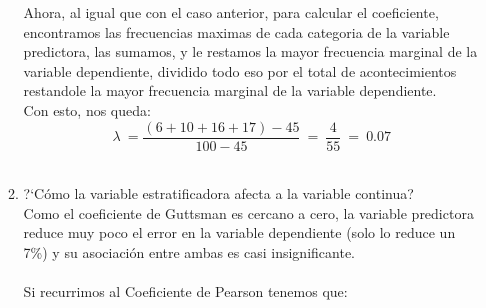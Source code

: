 \documentclass[letterpaper,spanish,11pt]{article}
\begin{document}
\begin{itemize}
\begin{enumerate}
	Ahora, al igual que con el caso anterior, para calcular el coeficiente, encontramos las frecuencias maximas de cada categoria de la variable predictora, las sumamos, y le restamos la mayor frecuencia marginal de la variable dependiente, dividido todo eso por el total de acontecimientos restandole la mayor frecuencia marginal de la variable dependiente.\\

	Con esto, nos queda:\\
	$$\lambda\ = \dfrac{(6+10+16+17)-45}{100-45}\ =\ \dfrac{4}{55}\ =\ 0.07$$\\
	
	

%	
%
%
%
\item ?`C\'omo la variable estratificadora afecta a la variable continua?\\

	Como el coeficiente de Guttsman es cercano a cero, la variable predictora reduce muy poco el error en la variable dependiente (solo lo reduce un 7\%) y su asociaci\'on entre ambas es casi insignificante.\\\\

	Si recurrimos al Coeficiente de Pearson tenemos que:\\ \\
	

\end{enumerate}
\end{itemize}
\end{document}
